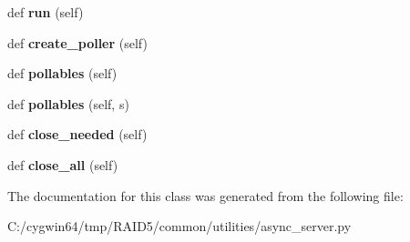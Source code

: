 \begin{DoxyCompactItemize}
\item 
\mbox{\label{class_r_a_i_d5_1_1common_1_1utilities_1_1async__server_1_1_async_server_a9ddc117230bb5e2cadedebe17eaff2aa}} 
def {\bfseries run} (self)
\item 
\mbox{\label{class_r_a_i_d5_1_1common_1_1utilities_1_1async__server_1_1_async_server_ab7154ace3700577c788fcc079735e505}} 
def {\bfseries create\+\_\+poller} (self)
\item 
\mbox{\label{class_r_a_i_d5_1_1common_1_1utilities_1_1async__server_1_1_async_server_aa4f6e6ce14625b565207c22554244097}} 
def {\bfseries pollables} (self)
\item 
\mbox{\label{class_r_a_i_d5_1_1common_1_1utilities_1_1async__server_1_1_async_server_a03fc561aa7bf92660cf926edc431e1f9}} 
def {\bfseries pollables} (self, s)
\item 
\mbox{\label{class_r_a_i_d5_1_1common_1_1utilities_1_1async__server_1_1_async_server_afc6026c2e79b2ade1cc960c204a2bcb1}} 
def {\bfseries close\+\_\+needed} (self)
\item 
\mbox{\label{class_r_a_i_d5_1_1common_1_1utilities_1_1async__server_1_1_async_server_a3ee5a7b99c9a7318817e2e2ebf6a7efb}} 
def {\bfseries close\+\_\+all} (self)
\end{DoxyCompactItemize}


The documentation for this class was generated from the following file\+:\begin{DoxyCompactItemize}
\item 
C\+:/cygwin64/tmp/\+R\+A\+I\+D5/common/utilities/async\+\_\+server.\+py\end{DoxyCompactItemize}
